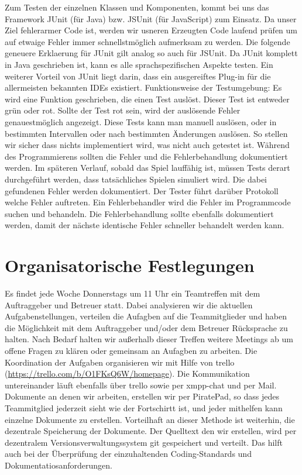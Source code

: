 \documentclass[11pt,a4paper]{article}
\begin{document}
Zum Testen der einzelnen Klassen und Komponenten, kommt bei uns das Framework JUnit (für Java) bzw. JSUnit (für JavaScript) zum Einsatz. Da unser Ziel fehlerarmer Code ist, werden wir usneren Erzeugten Code laufend prüfen um auf etwaige Fehler immer schnellstmöglich aufmerksam zu werden. 
Die folgende geneuere Erklaerung für JUnit gilt analog so auch für JSUnit.
Da JUnit komplett in Java geschrieben ist, kann es alle sprachspezifischen Aspekte testen. Ein weiterer Vorteil von JUnit liegt darin, dass ein ausgereiftes Plug-in für die allermeisten bekannten IDEs existiert. Funktionsweise der Testumgebung: Es wird eine Funktion geschrieben, die einen Test auslöst. Dieser Test ist entweder grün oder rot. Sollte der Test rot sein, wird der auslösende Fehler genauestmöglich angezeigt. Diese Tests kann man manuell auslösen, oder in bestimmten Intervallen oder nach bestimmten Änderungen auslösen. So stellen wir sicher dass nichts implementiert wird, was nicht auch getestet ist. Während des Programmierens sollten die Fehler und die Fehlerbehandlung dokumentiert werden.
Im späteren Verlauf, sobald das Spiel lauffähig ist, müssen Tests derart durchgeführt werden, dass tatsächliches Spielen simuliert wird. Die dabei gefundenen Fehler werden dokumentiert. Der Tester führt darüber Protokoll welche Fehler auftreten. Ein Fehlerbehandler wird die Fehler im Programmcode suchen und behandeln. Die Fehlerbehandlung sollte ebenfalls dokumentiert werden, damit der nächste identische Fehler schneller behandelt werden kann. 

\section{Organisatorische Festlegungen}

Es findet jede Woche Donnerstags um 11 Uhr ein Teamtreffen mit dem Auftraggeber und Betreuer statt. Dabei analysieren wir die aktuellen Aufgabenstellungen, verteilen die Aufagben auf die Teammitglieder und haben die Möglichkeit mit dem Auftraggeber und/oder dem Betreuer Rücksprache zu halten. Nach Bedarf halten wir außerhalb dieser Treffen weitere Meetings ab um offene Fragen zu klären oder gemeinsam an Aufagben zu arbeiten. Die Koordination der Aufgaben organisieren wir mit Hilfe von trello (\url{https://trello.com/b/O1FKsQ6W/homepage}). Die Kommunikation untereinander läuft ebenfalls über trello sowie per xmpp-chat und per Mail. Dokumente an denen wir arbeiten, erstellen wir per PiratePad, so dass jedes Teammitglied jederzeit sieht wie der Fortschirtt ist, und jeder mithelfen kann einzelne Dokumente zu erstellen. Vorteilhaft an dieser Methode ist weiterhin, die dezentrale Speicherung der Dokumente. Der Quelltext den wir erstellen, wird per dezentralem Versionsverwaltungssystem git gespeichert und verteilt. Das hilft auch bei der Überprüfung der einzuhaltenden Coding-Standards und Dokumentatiosanforderungen.
\end{document}
